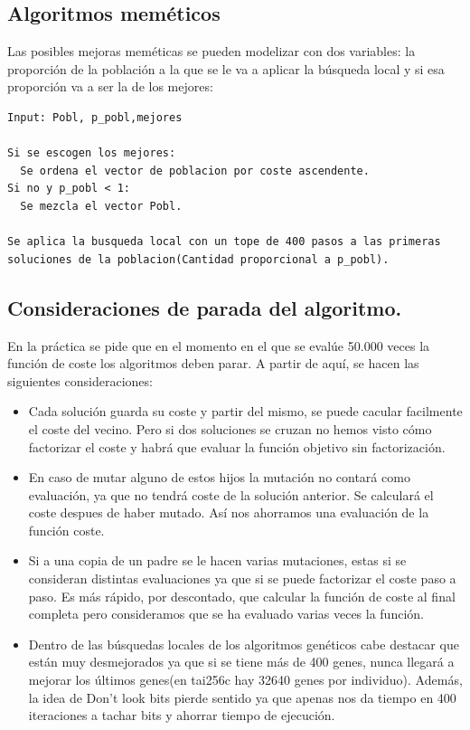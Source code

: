 \subsection{Algoritmos meméticos}

Las posibles mejoras meméticas se pueden modelizar con dos variables: la proporción de la población a la que se le va a aplicar la búsqueda local y si esa proporción va a ser la de los mejores:

\begin{lstlisting}
Input: Pobl, p_pobl,mejores

Si se escogen los mejores:
  Se ordena el vector de poblacion por coste ascendente.
Si no y p_pobl < 1:
  Se mezcla el vector Pobl.

Se aplica la busqueda local con un tope de 400 pasos a las primeras
soluciones de la poblacion(Cantidad proporcional a p_pobl).
\end{lstlisting}

\newpage

\subsection{Consideraciones de parada del algoritmo.}

En la práctica se pide que en el momento en el que se evalúe 50.000 veces la función de coste los algoritmos deben parar. A partir de aquí, se hacen las siguientes consideraciones:\\

\begin{itemize}
	\item Cada solución guarda su coste y partir del mismo, se puede cacular facilmente el coste del vecino. Pero si dos soluciones se cruzan no hemos visto cómo factorizar el coste y habrá que evaluar la función objetivo sin factorización.
	
	\item En caso de mutar alguno de estos hijos la mutación no contará como evaluación, ya que no tendrá coste de la solución anterior. Se calculará el coste despues de haber mutado. Así nos ahorramos una evaluación de la función coste.
	
	\item Si a una copia de un padre se le hacen varias mutaciones, estas si se consideran distintas evaluaciones ya que si se puede factorizar el coste paso a paso. Es más rápido, por descontado, que calcular la función de coste al final completa pero consideramos que se ha evaluado varias veces la función.
	
	\item Dentro de las búsquedas locales de los algoritmos genéticos cabe destacar que están muy desmejorados ya que si se tiene más de 400 genes, nunca llegará a mejorar los últimos genes(en tai256c hay 32640 genes por individuo). Además, la idea de Don't look bits pierde sentido ya que apenas nos da tiempo en 400 iteraciones a tachar bits y ahorrar tiempo de ejecución.
\end{itemize}

